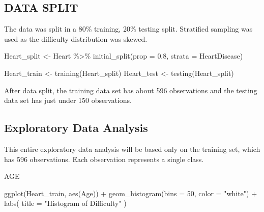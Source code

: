 \documentclass[
]{article}
\newenvironment{Shaded}{\begin{snugshade}}{\end{snugshade}}
\newcommand{\AttributeTok}[1]{\textcolor[rgb]{0.77,0.63,0.00}{#1}}
\newcommand{\DecValTok}[1]{\textcolor[rgb]{0.00,0.00,0.81}{#1}}
\newcommand{\FloatTok}[1]{\textcolor[rgb]{0.00,0.00,0.81}{#1}}
\newcommand{\FunctionTok}[1]{\textcolor[rgb]{0.00,0.00,0.00}{#1}}
\newcommand{\NormalTok}[1]{#1}
\newcommand{\OtherTok}[1]{\textcolor[rgb]{0.56,0.35,0.01}{#1}}
\newcommand{\SpecialCharTok}[1]{\textcolor[rgb]{0.00,0.00,0.00}{#1}}
\newcommand{\StringTok}[1]{\textcolor[rgb]{0.31,0.60,0.02}{#1}}
\begin{document}
\hypertarget{data-split}{%
\subsection{DATA SPLIT}\label{data-split}}

The data was split in a 80\% training, 20\% testing split. Stratified
sampling was used as the difficulty distribution was skewed.

\begin{Shaded}
\begin{Highlighting}[]
\NormalTok{Heart\_split }\OtherTok{\textless{}{-}}\NormalTok{ Heart }\SpecialCharTok{\%\textgreater{}\%} 
  \FunctionTok{initial\_split}\NormalTok{(}\AttributeTok{prop =} \FloatTok{0.8}\NormalTok{, }\AttributeTok{strata =}\NormalTok{ HeartDisease)}

\NormalTok{Heart\_train }\OtherTok{\textless{}{-}} \FunctionTok{training}\NormalTok{(Heart\_split)}
\NormalTok{Heart\_test }\OtherTok{\textless{}{-}} \FunctionTok{testing}\NormalTok{(Heart\_split)}
\end{Highlighting}
\end{Shaded}

After data split, the training data set has about 596 observations and
the testing data set has just under 150 observations.

\hypertarget{exploratory-data-analysis}{%
\subsection{Exploratory Data Analysis}\label{exploratory-data-analysis}}

This entire exploratory data analysis will be based only on the training
set, which has 596 observations. Each observation represents a single
class.

AGE

\begin{Shaded}
\begin{Highlighting}[]
\FunctionTok{ggplot}\NormalTok{(Heart\_train, }\FunctionTok{aes}\NormalTok{(Age)) }\SpecialCharTok{+}
  \FunctionTok{geom\_histogram}\NormalTok{(}\AttributeTok{bins =} \DecValTok{50}\NormalTok{, }\AttributeTok{color =} \StringTok{"white"}\NormalTok{) }\SpecialCharTok{+}
  \FunctionTok{labs}\NormalTok{(}
    \AttributeTok{title =} \StringTok{"Histogram of Difficulty"}
\NormalTok{  )}
\end{Highlighting}
\end{Shaded}
\end{document}
